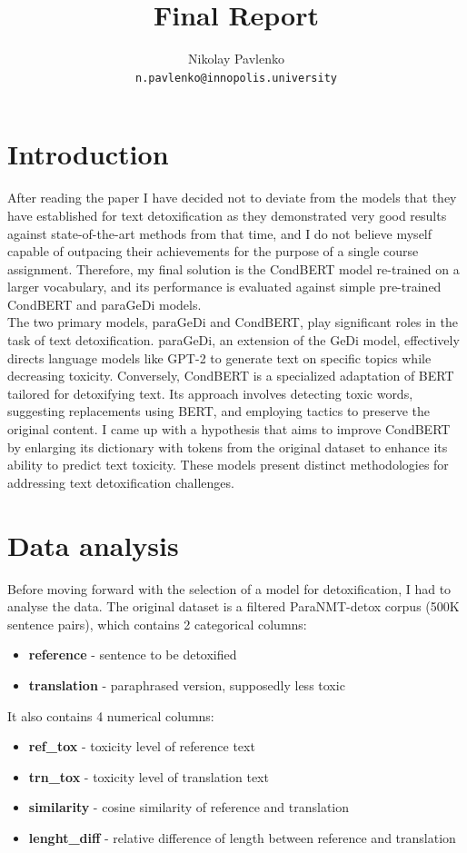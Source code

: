 \documentclass[]{article}
\title{Final Report}
\author{
	Nikolay Pavlenko\\
	\texttt{n.pavlenko@innopolis.university}
}
\begin{document}
	\maketitle
	\section{Introduction}
	After reading the paper \cite{main} I have decided not to deviate from the models that they have established for text detoxification as they demonstrated very good results against state-of-the-art methods from that time, and I do not believe myself capable of outpacing their achievements for the purpose of a single course assignment. Therefore, my final solution is the CondBERT model re-trained on a larger vocabulary, and its performance is evaluated against simple pre-trained CondBERT and paraGeDi models. \\
	
	The two primary models, paraGeDi and CondBERT, play significant roles in the task of text detoxification. paraGeDi, an extension of the GeDi model, effectively directs language models like GPT-2 to generate text on specific topics while decreasing toxicity. Conversely, CondBERT is a specialized adaptation of BERT tailored for detoxifying text. Its approach involves detecting toxic words, suggesting replacements using BERT, and employing tactics to preserve the original content. I came up with a hypothesis that aims to improve CondBERT by enlarging its dictionary with tokens from the original dataset to enhance its ability to predict text toxicity. These models present distinct methodologies for addressing text detoxification challenges. 
	\\
	\section{Data analysis}
	Before moving forward with the selection of a model for detoxification, I had to analyse the data. The original dataset is a filtered ParaNMT-detox corpus (500K sentence pairs), which contains 2 categorical columns: 
	\begin{itemize}
		\item \textbf{reference} - sentence to be detoxified
		\item \textbf{translation} - paraphrased version, supposedly less toxic
	\end{itemize}
	
	It also contains 4 numerical columns: 
	\begin{itemize}
		\item \textbf{ref\_tox} - toxicity level of reference text
		\item \textbf{trn\_tox} - toxicity level of translation text
		\item \textbf{similarity} - cosine similarity of reference and translation
		\item \textbf{lenght\_diff} - relative difference of length between reference and translation
	\end{itemize}
	
\end{document}
